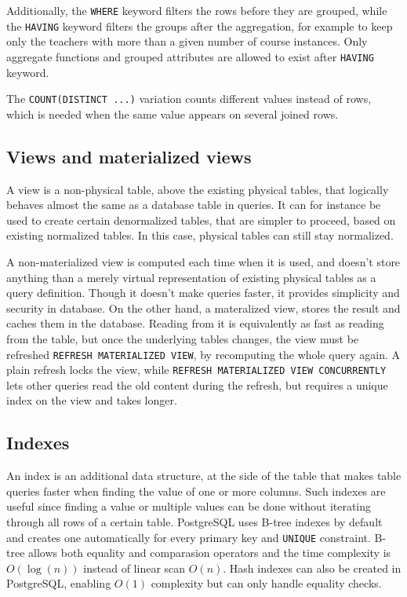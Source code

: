 \documentclass[a4paper]{scrartcl}
\renewcommand{\_}{\textunderscore\allowbreak}
\begin{document}
Additionally, the \texttt{WHERE} keyword filters the rows before they are grouped, while the \texttt{HAVING} keyword filters the groups after the aggregation, for example to keep only the teachers with more than a given number of course instances. Only aggregate functions and grouped attributes are allowed to exist after \texttt{HAVING} keyword.

The \texttt{COUNT(DISTINCT ...)} variation counts different values instead of rows, which is needed when the same value appears on several joined rows.

\subsection{Views and materialized views}

A view is a non-physical table, above the existing physical tables, that logically behaves almost the same as a database table in queries. It can for instance be used to create certain denormalized tables, that are simpler to proceed, based on existing normalized tables. In this case, physical tables can still stay normalized.

A non-materialized view is computed each time when it is used, and doesn't store anything than a merely virtual representation of existing physical tables as a query definition. Though it doesn't make queries faster, it provides simplicity and security in database. On the other hand, a materalized view, stores the result and caches them in the database. Reading from it is equivalently as fast as reading from the table, but once the underlying tables changes, the view must be refreshed \texttt{REFRESH MATERIALIZED VIEW}, by recomputing the whole query again. A plain refresh locks the view, while \texttt{REFRESH MATERIALIZED VIEW CONCURRENTLY} lets other queries read the old content during the refresh, but requires a unique index on the view and takes longer.

\subsection{Indexes}

An index is an additional data structure, at the side of the table that makes table queries faster when finding the value of one or more columns. Such indexes are useful since finding a value or multiple values can be done without iterating through all rows of a certain table. PostgreSQL uses B-tree indexes by default and creates one automatically for every primary key and \texttt{UNIQUE} constraint. B-tree allows both equality and comparasion operators and the time complexity is $O(\log(n))$ instead of linear scan $O(n)$. Hash indexes can also be created in PostgreSQL, enabling $O(1)$ complexity but can only handle equality checks.
\end{document}
